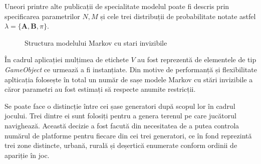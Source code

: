 Uneori printre alte publicații de specialitate modelul poate fi descris prin specificarea parametrilor $N,M$ și cele trei distribuții de probabilitate notate astfel $\lambda = \{\textbf{A},\textbf{B},\pi\}$.\par
\vspace{10mm}
\begin{figure}[H]
\centering
{}
\caption{Structura modelului Markov cu stari invizibile}
\end{figure}
\par

În cadrul aplicației mulțimea de etichete $V$ au fost reprezentă de elementele de tip \textit{GameObject} ce urmează a fi instanțiate. Din motive de performanță și flexibilitate aplticația folosește în total un număr de sașe modele Markov cu stări invizibile a căror parametri au fost estimați să respecte anumite restricții.\par

Se poate face o distincție între cei șase generatori după scopul lor în cadrul jocului. Trei dintre ei sunt folosiți pentru a genera terenul pe care jucătorul navighează. Această decizie a fost facută din necesitatea de a putea controla numărul de platforme pentru fiecare din cei trei generatori, ce în fond reprezintă trei zone distincte, urbană, rurală și deșertică enumerate conform ordinii de apariție în joc.\par

